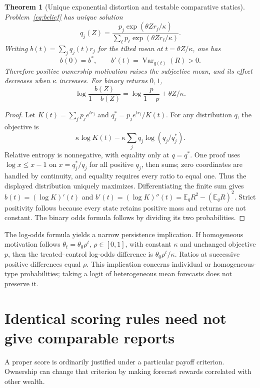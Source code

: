 \documentclass[11pt,a4paper]{article}
\newtheorem{theorem}{Theorem}[section]
\theoremstyle{definition}
\theoremstyle{remark}
\newcommand{\E}{\mathbb E}
\newcommand{\Var}{\operatorname{Var}}
\begin{document}
\begin{theorem}[Unique exponential distortion and testable comparative statics]\label{th:tilt}
Problem~\eqref{eq:belief} has unique solution
\[
 q_j(Z)=\frac{p_j\exp(\theta Zr_j/\kappa)}
                    {\sum_\ell p_\ell\exp(\theta Zr_\ell/\kappa)}.
\]
Writing $b(t)=\sum_jq_j(t)r_j$ for the tilted mean at $t=\theta Z/\kappa$, one has
\[
 b(0)=b^*,\qquad b'(t)=\Var_{q(t)}(R)>0.
\]
Therefore positive ownership motivation raises the subjective mean, and its effect decreases when $\kappa$ increases. For binary returns $0,1$,
\[
 \log\frac{b(Z)}{1-b(Z)}=\log\frac{p}{1-p}+\theta Z/\kappa.
\]
\end{theorem}
\begin{proof}
Let $K(t)=\sum_jp_je^{tr_j}$ and $q_j^*=p_je^{tr_j}/K(t)$. For any distribution $q$, the objective is
\[
 \kappa\log K(t)-\kappa\sum_jq_j\log(q_j/q_j^*).
\]
Relative entropy is nonnegative, with equality only at $q=q^*$. One proof uses $\log x\leq x-1$ on $x=q_j^*/q_j$ for all positive $q_j$, then sums; zero coordinates are handled by continuity, and equality requires every ratio to equal one. Thus the displayed distribution uniquely maximizes. Differentiating the finite sum gives $b(t)=(\log K)'(t)$ and $b'(t)=(\log K)''(t)=\E_qR^2-(\E_qR)^2$. Strict positivity follows because every state retains positive mass and returns are not constant. The binary odds formula follows by dividing its two probabilities.
\end{proof}

The log-odds formula yields a narrow persistence implication. If homogeneous motivation follows $\theta_t=\theta_0\rho^t$, $\rho\in[0,1]$, with constant $\kappa$ and unchanged objective $p$, then the treated--control log-odds difference is $\theta_0\rho^t/\kappa$. Ratios at successive positive differences equal $\rho$. This implication concerns individual or homogeneous-type probabilities; taking a logit of heterogeneous mean forecasts does not preserve it.

\section{Identical scoring rules need not give comparable reports}
A proper score is ordinarily justified under a particular payoff criterion. Ownership can change that criterion by making forecast rewards correlated with other wealth.
\end{document}
